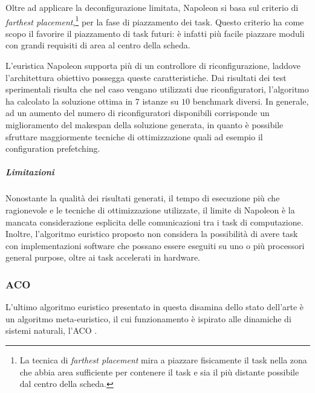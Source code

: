 Oltre ad applicare la deconfigurazione limitata, Napoleon si basa sul criterio 
di \emph{farthest placement},\footnote{La tecnica di \emph{farthest placement} 
mira a piazzare fisicamente il task nella zona che abbia area sufficiente per 
contenere il task e sia il più distante possibile dal centro della scheda.} per 
la fase di piazzamento dei task. Questo criterio ha come scopo il favorire il 
piazzamento di task futuri: è infatti più facile piazzare moduli con grandi 
requisiti di area al centro della scheda.

L'euristica Napoleon supporta più di un controllore di riconfigurazione, 
laddove l'architettura obiettivo possegga queste caratteristiche. Dai risultati 
dei test sperimentali risulta che nel caso vengano utilizzati due 
riconfiguratori, l'algoritmo ha calcolato la soluzione ottima in $7$ istanze su 
$10$ benchmark diversi. In generale, ad un aumento del numero di 
riconfiguratori disponibili corrisponde un miglioramento del makespan della 
soluzione generata, in quanto è possibile sfruttare maggiormente tecniche di 
ottimizzazione quali ad esempio il configuration prefetching.

\subparagraph{Limitazioni}
Nonostante la qualità dei risultati generati, il tempo di esecuzione più che 
ragionevole e le tecniche di ottimizzazione utilizzate, il limite di Napoleon è 
la mancata considerazione esplicita delle comunicazioni tra i task di 
computazione. Inoltre, l'algoritmo euristico proposto non considera la 
possibilità di avere task con implementazioni software che possano essere 
eseguiti su uno o più processori general purpose, oltre ai task accelerati in 
hardware.


\subsubsection{\acl{ACO}}
L'ultimo algoritmo euristico presentato in questa disamina dello stato 
dell'arte è un algoritmo meta-euristico, il cui funzionamento è ispirato alle 
dinamiche di sistemi naturali, l'\ac{ACO} \cite{AntSystem}. 




